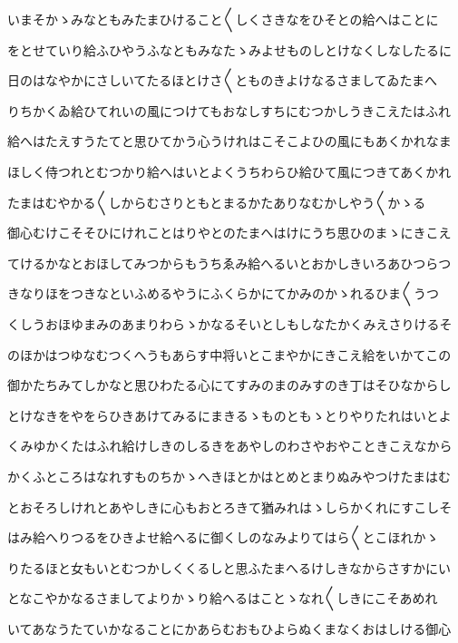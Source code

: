 \documentclass[a4paper,11pt,landscape]{ltjtarticle}
\begin{document}
\par\medskip
いまそかゝみなともみたまひけること〱しくさきなをひそとの給へはことに
\par\medskip
をとせていり給ふひやうふなともみなたゝみよせものしとけなくしなしたるに
\par\medskip
日のはなやかにさしいてたるほとけさ〱とものきよけなるさましてゐたまへ
\par\medskip
りちかくゐ給ひてれいの風につけてもおなしすちにむつかしうきこえたはふれ
\par\medskip
給へはたえすうたてと思ひてかう心うけれはこそこよひの風にもあくかれなま
\par\medskip
ほしく侍つれとむつかり給へはいとよくうちわらひ給ひて風につきてあくかれ
\par\medskip
たまはむやかる〱しからむさりともとまるかたありなむかしやう〱かゝる
\par\medskip
御心むけこそそひにけれことはりやとのたまへはけにうち思ひのまゝにきこえ
\par\medskip
てけるかなとおほしてみつからもうちゑみ給へるいとおかしきいろあひつらつ
\par\medskip
きなりほをつきなといふめるやうにふくらかにてかみのかゝれるひま〱うつ
\par\medskip
くしうおほゆまみのあまりわらゝかなるそいとしもしなたかくみえさりけるそ
\par\medskip
のほかはつゆなむつくへうもあらす中将いとこまやかにきこえ給をいかてこの
\par\medskip
御かたちみてしかなと思ひわたる心にてすみのまのみすのき丁はそひなからし
\par\medskip
とけなきをやをらひきあけてみるにまきるゝものともゝとりやりたれはいとよ
\par\medskip
くみゆかくたはふれ給けしきのしるきをあやしのわさやおやこときこえなから
\par\medskip
かくふところはなれすものちかゝへきほとかはとめとまりぬみやつけたまはむ
\par\medskip
とおそろしけれとあやしきに心もおとろきて猶みれはゝしらかくれにすこしそ
\par\medskip
はみ給へりつるをひきよせ給へるに御くしのなみよりてはら〱とこほれかゝ
\par\medskip
りたるほと女もいとむつかしくくるしと思ふたまへるけしきなからさすかにい
\par\medskip
となこやかなるさましてよりかゝり給へるはことゝなれ〱しきにこそあめれ
\par\medskip
いてあなうたていかなることにかあらむおもひよらぬくまなくおはしける御心
\par\medskip
\end{document}
